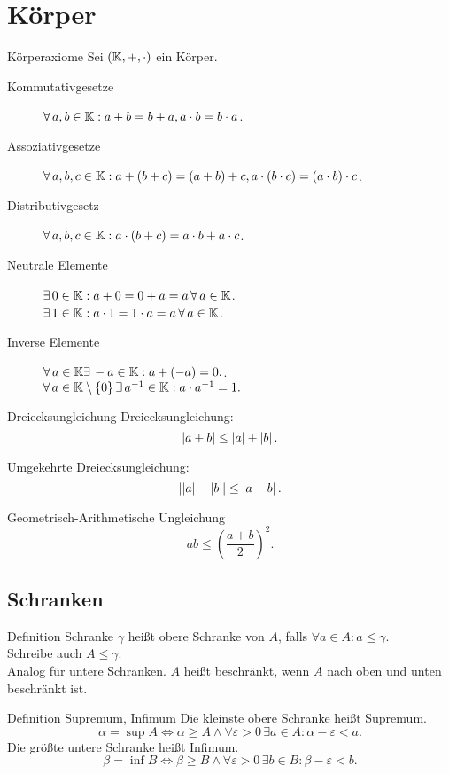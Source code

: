 \documentclass[main.tex]{subfiles}
\begin{document}
\section*{Körper}
\begin{karte}{Körperaxiome}
    Sei \( (\mathbb{K}, +, \cdot ) \) ein Körper.
    \begin{description}
        \item[Kommutativgesetze] \( \forall a,b\in \K: a + b = b + a, a \cdot b = b \cdot a \).
        \item[Assoziativgesetze] \( \forall a,b,c \in \K: 
        a + (b + c) = (a + b) + c, a \cdot (b \cdot c) = (a \cdot b) \cdot c \).
        \item[Distributivgesetz] \( \forall a,b,c\in \K: 
        a \cdot (b + c) = a \cdot b + a \cdot c \).
        \item[Neutrale Elemente] 
        \( \exists 0 \in \K: a + 0 = 0 + a = a \,\forall a \in \K \).\\
        \( \exists 1 \in \K: a \cdot 1 = 1 \cdot a = a \,\forall a \in \K \).
        \item[Inverse Elemente] 
        \( \forall a \in \K \exists -a \in \K: a + (-a) = 0. \).\\
        \( \forall a \in \K \setminus \set{0} \, \exists a^{-1} \in \K: a \cdot a^{-1} = 1. \)
    \end{description}
\end{karte}
\begin{karte}{Dreiecksungleichung}
   Dreiecksungleichung: 
   \[ \left| a + b \right| \leq \left| a \right| + \left| b \right|. \]

   Umgekehrte Dreiecksungleichung: 
   \[ \left|  \left| a \right| - \left| b \right|  \right| \leq \left|  a - b  \right|. \]
\end{karte}
\begin{karte}{Geometrisch-Arithmetische Ungleichung}
    \[ ab \leq {\left( \frac{a + b}{2} \right)}^2. \]
\end{karte}
\subsection*{Schranken}
\begin{karte}{Definition Schranke}
    \( \gamma \) heißt 
    obere Schranke von \(A\), falls \( \forall a \in A : a \leq \gamma \).\\
    Schreibe auch \( A \leq \gamma \).\\
    Analog für untere Schranken.
    \( A \) heißt beschränkt, wenn \(A\) nach oben und unten beschränkt ist.
\end{karte}
\begin{karte}{Definition Supremum, Infimum}
    Die kleinste obere Schranke heißt Supremum.
    \[ \alpha = \sup A \Leftrightarrow \alpha \geq A \wedge 
    \forall \varepsilon > 0 \,\exists a \in A: \alpha - \varepsilon < a. \]
    Die größte untere Schranke heißt Infimum.
    \[ \beta = \inf B \Leftrightarrow \beta \geq B \wedge 
    \forall \varepsilon > 0 \,\exists b \in B: \beta - \varepsilon < b. \]
\end{karte}
\end{document}

